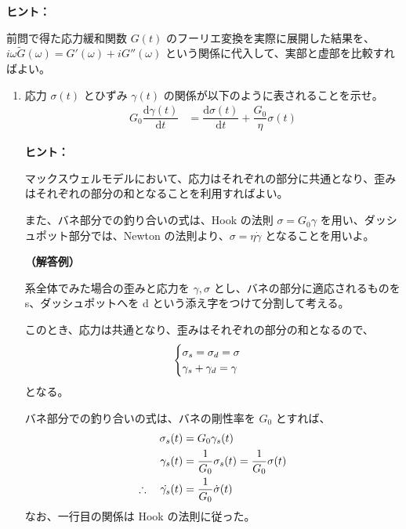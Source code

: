 \documentclass[uplatex,dvipdfmx,a4paper,11pt]{jsarticle}
\newcommand{\diff}{\mathrm d}
\newcommand{\difd}[2]{\dfrac{\diff #1}{\diff #2}}
\begin{document}
\begin{enumerate}
\begin{itembox}[l]{{\bf ヒント：}}

前問で得た応力緩和関数 $G(t)$ のフーリエ変換を実際に展開した結果を、$i\omega \tilde{G} (\omega) = G'(\omega) + i G''(\omega)$ という関係に代入して、実部と虚部を比較すればよい。

\end{itembox}

\end{enumerate}



\newpage

\begin{enumerate}
\item
応力 $\sigma (t)$ とひずみ $\gamma(t)$ の関係が以下のように表されることを示せ。
\begin{align*}
G_0 \difd{\gamma (t)}{t}  
	&= \difd{\sigma (t)}{t} + \dfrac{G_0}{\eta} \sigma (t)
\end{align*}

\begin{itembox}[l]{{\bf ヒント：}}

マックスウェルモデルにおいて、応力はそれぞれの部分に共通となり、歪みはそれぞれの部分の和となることを利用すればよい。

また、バネ部分での釣り合いの式は、Hook の法則 $\sigma = G_0 \gamma$ を用い、ダッシュポット部分では、Newton の法則より、$\sigma = \eta \dot{\gamma}$ となることを用いよ。

\end{itembox}

{\bf （解答例）}

系全体でみた場合の歪みと応力を $\gamma, \sigma$ とし、バネの部分に適応されるものを s、ダッシュポットへを d という添え字をつけて分割して考える。

このとき、応力は共通となり、歪みはそれぞれの部分の和となるので、
\begin{equation*}
\begin{cases}
\sigma_s = \sigma_d = \sigma \notag \\
\gamma_s + \gamma_d = \gamma
\end{cases}
\end{equation*}
となる。

バネ部分での釣り合いの式は、バネの剛性率を $G_0$ とすれば、
\begin{align*}
\sigma_s (t) &= G_0 \gamma_s (t) \notag \\
\gamma_s (t) &= \dfrac{1}{G_0} \sigma_s (t) = \dfrac{1}{G_0} \sigma (t) \notag \\
\therefore \quad \dot{\gamma_s} (t) &= \dfrac{1}{G_0} \dot{\sigma} (t)
\end{align*}
なお、一行目の関係は Hook の法則に従った。


\end{enumerate}
\end{document}
